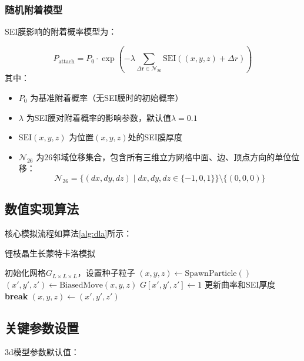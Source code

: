 \documentclass{article}
\begin{document}
\subsubsection{随机附着模型}
SEI膜影响的附着概率模型为：

\begin{equation}
P_{\text{attach}} = P_0 \cdot \exp\left(-\lambda \sum\limits_{\Delta\mathbf{r}\in \mathcal{N}_{26}} \text{SEI}\left((x,y,z)+\Delta r\right)\right)
\end{equation}
其中：
\begin{itemize}
\item $P_0$ 为基准附着概率（无SEI膜时的初始概率）
\item $\lambda$ 为SEI膜对附着概率的影响参数，默认值$\lambda=0.1$
\item $\text{SEI}(x,y,z)$ 为位置$(x,y,z)$处的SEI膜厚度
\item $\mathcal{N}_{26}$ 为26邻域位移集合，包含所有三维立方网格中面、边、顶点方向的单位位移：
\[
\mathcal{N}_{26} = \big\{ (dx, dy, dz) \mid dx, dy, dz \in \{-1, 0, 1\} \big\} \setminus \{(0, 0, 0)\}
\]
\end{itemize}
\subsection{数值实现算法}
核心模拟流程如算法\ref{alg:dla}所示：

\begin{algorithm}[H]
\caption{锂枝晶生长蒙特卡洛模拟}
\begin{algorithmic}[1]
\STATE 初始化网格$G_{L\times L\times L}$，设置种子粒子
    \STATE $(x,y,z) \leftarrow \text{SpawnParticle}()$ 
        \STATE $(x',y',z') \leftarrow \text{BiasedMove}(x,y,z)$ 
            \STATE $G[x',y',z'] \leftarrow 1$ 
            \STATE 更新曲率和SEI厚度
            \STATE \textbf{break}
        \ENDIF
        \STATE $(x,y,z) \leftarrow (x',y',z')$
    \ENDFOR
\ENDFOR
\end{algorithmic}
\label{alg:dla}
\end{algorithm}

\subsection{关键参数设置}
3d模型参数默认值：
\end{document}
